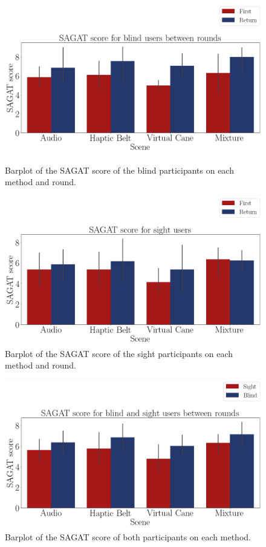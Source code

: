 \begin{figure}[!htb]
    \centering
    \begin{minipage}{\textwidth}
        \centering
        \includegraphics[width = 0.8\linewidth]{Resultados/Sagat/Figuras/png/barplot_sagat_avg_4_scene_blind.png}
        \caption{Barplot of the SAGAT score of the blind participants on each method and round.}
        \label{fig:barplot_sagat_avg_4_scene_blind}
    \end{minipage}
    \begin{minipage}{\textwidth}
        \centering
        \includegraphics[width = 0.8\linewidth]{Resultados/Sagat/Figuras/png/barplot_sagat_avg_4_scene_sight.png}
        \caption{Barplot of the SAGAT score of the sight participants on each method and round.}
        \label{fig:barplot_sagat_avg_4_scene_sight}
    \end{minipage}
\end{figure}
\begin{figure}[!htb]
    \centering
    \includegraphics[width = 0.8\linewidth]{Resultados/Sagat/Figuras/png/barplot_sagat_avg_4_scene.png}
    \caption{Barplot of the SAGAT score of both participants on each method.}
    \label{fig:barplot_sagat_avg_4_scene}
\end{figure}

